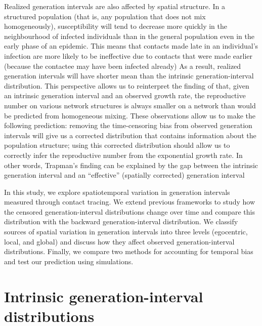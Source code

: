 \documentclass[12pt]{article}
\begin{document}
Realized generation intervals are also affected by spatial structure.
In a structured population (that is, any population that does not mix homogeneously), susceptibility will tend to decrease more quickly in the neighbourhood of infected individuals than in the general population even in the early phase of an epidemic. 
This means that contacts made late in an individual's infection are more likely to be ineffective due to contacts that were made earlier (because the contactee may have been infected already) 
As a result, realized generation intervals will have shorter mean than the intrinsic generation-interval distribution.
This perspective allows us to reinterpret the finding of \cite{trapman2016inferring} that, given an intrinsic generation interval and an observed growth rate, the reproductive number on various network structures is always smaller on a network than would be predicted from homogeneous mixing.
These observations allow us to make the following prediction: removing the time-censoring bias from observed generation intervals will give us a corrected distribution that contains information about the population structure; using this corrected distribution should allow us to correctly infer the reproductive number from the exponential growth rate. In other words, Trapman's finding can be explained by the gap between the intrinsic generation interval and an ``effective'' (spatially corrected) generation interval \jdnew

In this study, we explore spatiotemporal variation in generation intervals measured through contact tracing.
We extend previous frameworks to study how the censored generation-interval distributions change over time and compare this distribution with the backward generation-interval distribution.
We classify sources of spatial variation in generation intervals into three levels (egocentric, local, and global) and discuss how they affect observed generation-interval distributions.
Finally, we compare two methods for accounting for temporal bias and test our prediction using simulations.

\section{Intrinsic generation-interval distributions}
\end{document}
